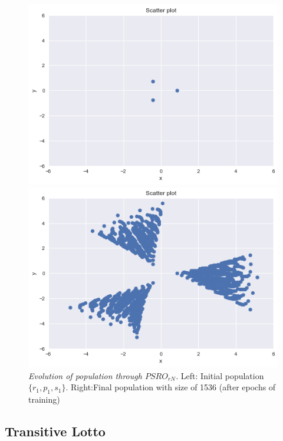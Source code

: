 \documentclass{article}
\begin{document}
\begin{figure}[!ht]
	\begin{minipage}{0.5\linewidth}
		\centering
		\includegraphics[scale=0.4]{psro1}
	\end{minipage}%
	\begin{minipage}{0.5\linewidth}
		\centering
		\includegraphics[scale=0.4]{psro16}
	\end{minipage}%
	\caption{\textit{Evolution of population through $PSRO_{rN}$.} Left: Initial population $\{r_1,p_1,s_1\}$. Right:Final population with size of 1536 (after epochs of training)}
	\label{fig:psro}
\end{figure}

\subsection{Transitive Lotto}
\end{document}
